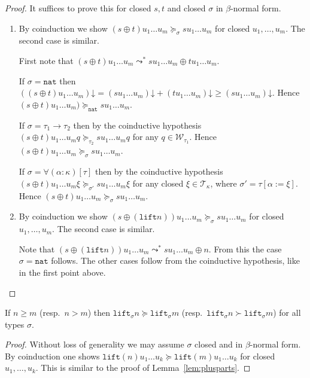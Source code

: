 \documentclass[runningheads,a4paper]{llncs}
\newcommand{\World}{\mathcal{W}}
\newcommand{\arrtype}{\rightarrow}
\newcommand{\subst}[2]{#1:=#2}
\newcommand{\Tc}{\mathcal{T}}
\newcommand{\nat}{\mathtt{nat}}
\newcommand{\lift}{\mathtt{lift}}
\newcommand{\da}{\mathord{\downarrow}}
\begin{document}
\begin{proof}
  It suffices to prove this for closed $s,t$ and closed $\sigma$ in
  $\beta$-normal form.
  \begin{enumerate}
  \item By coinduction we show $(s \oplus t) u_1 \ldots u_m
    \succeq_\sigma s u_1 \ldots u_m$ for closed $u_1,\ldots,u_m$. The
    second case is similar.

    First note that $(s \oplus t) u_1 \ldots u_m \leadsto^* s u_1
    \ldots u_m \oplus t u_1 \ldots u_m$.

    If $\sigma = \nat$ then $((s \oplus t) u_1 \ldots u_m)\da = (s u_1
    \ldots u_m)\da + (t u_1 \ldots u_m)\da \ge (s u_1 \ldots
    u_m)\da$. Hence $(s \oplus t) u_1 \ldots u_m) \succeq_\nat s u_1
    \ldots u_m$.

    If $\sigma = \tau_1\arrtype\tau_2$ then by the coinductive
    hypothesis $(s \oplus t) u_1 \ldots u_m q \succeq_{\tau_2} s u_1
    \ldots u_m q$ for any $q \in \World_{\tau_1}$. Hence $(s \oplus t)
    u_1 \ldots u_m \succeq_\sigma s u_1 \ldots u_m$.

    If $\sigma = \forall(\alpha:\kappa)[\tau]$ then by the coinductive
    hypothesis $(s \oplus t) u_1 \ldots u_m \xi \succeq_{\sigma'} s
    u_1 \ldots u_m \xi$ for any closed $\xi \in \Tc_\kappa$, where
    $\sigma' = \tau[\subst{\alpha}{\xi}]$. Hence $(s \oplus t) u_1
    \ldots u_m \succeq_\sigma s u_1 \ldots u_m$.
  \item By coinduction we show $(s \oplus (\lift n)) u_1 \ldots u_m
    \succeq_\sigma s u_1 \ldots u_m$ for closed $u_1,\ldots,u_m$. The
    second case is similar.

    Note that $(s \oplus (\lift n)) u_1 \ldots u_m \leadsto^* s u_1
    \ldots u_m \oplus n$. From this the case $\sigma=\nat$
    follows. The other cases follow from the coinductive hypothesis,
    like in the first point above.
  \end{enumerate}
\end{proof}

\begin{lemma}\label{lem:liftgreater}
  If $n \geq m$ (resp.~$n > m$) then $\lift_\sigma n \succeq
  \lift_\sigma m$ (resp.~$\lift_\sigma n \succ \lift_\sigma m$) for
  all types $\sigma$.
\end{lemma}

\begin{proof}
  Without loss of generality we may assume $\sigma$ closed and in
  $\beta$-normal form. By coinduction one shows $\lift(n) u_1 \ldots
  u_k \succeq \lift(m) u_1 \ldots u_k$ for closed
  $u_1,\ldots,u_k$. This is similar to the proof of
  Lemma~\ref{lem:plusparts}.
\end{proof}
\end{document}
